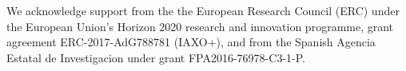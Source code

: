 \maketitle{}
\flushbottom




%




\acknowledgments
We acknowledge support from the the European Research Council (ERC) under the European Union’s Horizon 2020 research and innovation programme, grant agreement ERC-2017-AdG788781 (IAXO+), and from the Spanish Agencia Estatal de Investigacion under grant FPA2016-76978-C3-1-P.

  \centering














